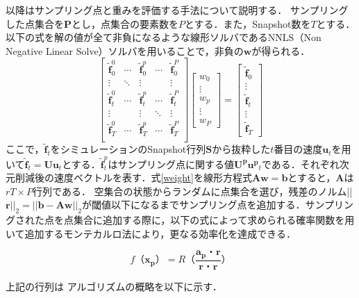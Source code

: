 \documentclass[a4j,12pt]{jreport}
\begin{document}
以降はサンプリング点と重みを評価する手法について説明する．
サンプリングした点集合を$\bm{P}$とし，点集合の要素数を$P$とする．また，Snapshot数を$T$とする．以下の式を解の値が全て非負になるような線形ソルバであるNNLS（Non Negative Linear Solve）ソルバを用いることで，非負の$\bm{w}$が得られる．
\begin{equation}\label{weight}
	 \begin{bmatrix}
	 \bm{\tilde{f}}^0_0	&\cdots	&\bm{\tilde{f}}^p_0	&\cdots	&\bm{\tilde{f}}^P_0\\
		\vdots		&\ddots		&\vdots		&		&\vdots			\\
	\bm{\tilde{f}}^0_t	&\cdots	&\bm{\tilde{f}}^p_t	&\cdots	&\bm{\tilde{f}}^P_t\\
		\vdots		&		&\vdots			&\ddots		&\vdots			\\
	\bm{\tilde{f}}^0_T	&\cdots	&\bm{\tilde{f}}^p_T	&\cdots	&\bm{\tilde{f}}^P_T\\
	\end{bmatrix}
	\begin{bmatrix}
	w_0 	\\
	\vdots \\
	w_p \\
	\vdots \\
	w_P
	\end{bmatrix}=
	\begin{bmatrix}
	\bm{\tilde{f}}_0 	\\
	\vdots \\
	\bm{\tilde{f}}_t \\
	\vdots \\
	\bm{\tilde{f}}_T
	\end{bmatrix}
\end{equation}
ここで，$\bm{\tilde{f}}_t $をシミュレーションのSnapshot行列$\mathbf{S}$から抜粋した$t$番目の速度$\bm{u}_t$を用いて$\bm{\tilde{f}}_t = \mathbf{U}\bm{u}_t$とする．$\bm{\tilde{f}}^p_t$はサンプリング点に関する値$\mathbf{U^p}\bm{u^p}_t$である．それぞれ次元削減後の速度ベクトルを表す．式\ref{weight}を線形方程式$\mathbf{A}\bm{w} = \bm{b}$とすると，$\mathbf{A}$は$rT\times P$行列である．
空集合の状態からランダムに点集合を選び，残差のノルム||$\bm{r}||_2 = ||\bm{b} - \mathbf{A}\bm{w}||_2$が閾値以下になるまでサンプリング点を追加する．サンプリングされた点を点集合に追加する際に，以下の式によって求められる確率関数を用いて追加するモンテカルロ法により，更なる効率化を達成できる．

\[
f（\bm{x_p}） = R（\frac{\bm{a_p}・\bm{r}}{\bm{r}・\bm{r}}）
\]

上記の行列は
アルゴリズムの概略を以下に示す．
\end{document}

